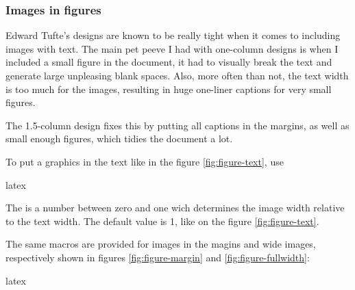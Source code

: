 \documentclass[raggedright, twoside, 11pt, colorful]{tufte-style-article}
\begin{document}
\subsubsection{Images in figures}
Edward Tufte's designs are known to be really tight when it comes to including images with text. The main pet peeve I had with one-column designs is when I included a small figure in the document, it had to visually break the text and generate large unpleasing blank spaces. Also, more often than not, the text width is too much for the images, resulting in huge one-liner captions for very small figures.

The 1.5-column design fixes this by putting all captions in the margins, as well as small enough figures, which tidies the document a lot.



To put a graphics in the text like in the figure \ref{fig:figure-text}, use
\begin{codebox}{latex}
\end{codebox}
The  is a number between zero and one wich determines the image width relative to the text width. The default value is 1, like on the figure \ref{fig:figure-text}.

The same macros are provided for images in the magins and wide images, respectively shown in figures \ref{fig:figure-margin} and \ref{fig:figure-fullwidth}:
\begin{codebox}{latex}
\end{codebox}

\end{document}
